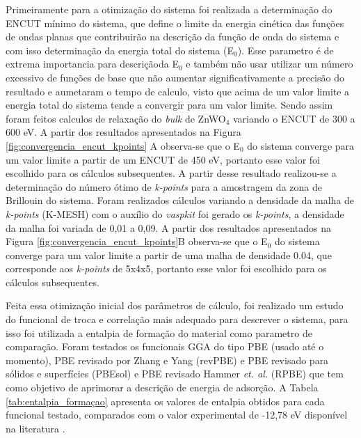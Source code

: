 Primeiramente para a otimização do sistema foi realizada a determinação do ENCUT mínimo do sistema, que define o limite da energia cinética das funções de ondas planas que contribuirão na descrição da função de onda do sistema e com isso determinação da energia total do sistema (E$_0$). Esse parametro é de extrema importancia para descriçãoda E$_0$ e também não usar utilizar um número excessivo de funções de base que não aumentar significativamente a precisão do resultado e aumetaram o tempo de calculo, visto que acima de um valor limite a energia total do sistema tende a convergir para um valor limite. Sendo assim foram feitos calculos de relaxação do \textit{bulk} de ZnWO$_4$ variando o ENCUT de 300 a 600 eV. A partir dos resultados apresentados na Figura \ref{fig:convergencia_encut_kpoints} A observa-se que o E$_0$ do sistema converge para um valor limite a partir de um ENCUT de 450 eV, portanto esse valor foi escolhido para os cálculos subsequentes. A partir desse resultado realizou-se a determinação do número ótimo de \textit{k-points} para a amostragem da zona de Brillouin do sistema. Foram realizados cálculos variando a densidade da malha de \textit{k-points} (K-MESH) com o auxílio do \textit{vaspkit} foi gerado os \textit{k-points}, a densidade da malha foi variada de 0,01 a 0,09. A partir dos resultados apresentados na Figura \ref{fig:convergencia_encut_kpoints}B observa-se que o E$_0$ do sistema converge para um valor limite a partir de uma malha de densidade 0.04, que corresponde aos \textit{k-points} de 5x4x5, portanto esse valor foi escolhido para os cálculos subsequentes.

Feita essa otimização inicial dos parâmetros de cálculo, foi realizado um estudo do funcional de troca e correlação mais adequado para descrever o sistema, para isso foi utilizada a entalpia de formação do material como parametro de comparação. Foram testados os funcionais GGA do tipo PBE (usado até o momento), PBE revisado por Zhang e Yang (revPBE) \cite{zhang1998comment} e PBE revisado para sólidos e superfícies (PBEsol) \cite{perdew2008restoring} e PBE revisado Hammer \textit{et. al.} (RPBE) \cite{hammer1999improved} que tem como objetivo de aprimorar a descrição de energia de adsorção. A Tabela \ref{tab:entalpia_formaçao} apresenta os valores de entalpia obtidos para cada funcional testado, comparados com o valor experimental de -12,78 eV disponível na literatura \cite{dellien1976chromium}.

